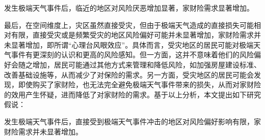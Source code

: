 \begin{hyp}
    \label{hyp:3}
    发生极端天气事件后，临近的地区对风险厌恶增加显著，家财险需求显著增加。
\end{hyp}
最后，在空间维度上，灾区虽然直接受灾，但由于极端天气造成的直接损失可能相对有限，直接受灾或是频繁受灾的地区风险偏好可能并未显著增加\citep{shao2024typhoons}，家财险需求并未显著增加，即所谓“心理台风眼效应”\citep{谢晓非2012心理台风眼效应研究综述}。具体而言，受灾地区的居民可能对极端天气事件有更深刻的认识和更高的风险感知。但一方面，这并不意味着他们的风险偏好会随之增加，居民可能通过其他方式来管理和降低风险，如加强房屋建设标准、改善基础设施等，从而减少了对保险的需求\citep{ZGRK202210006,JRYJ201403015}。另一方面，受灾地区的居民可能会发现，即使购买了家财险，也无法完全避免极端天气事件带来的损失，从而对家财险的效用产生怀疑，进而降低了对家财险的需求\citep{MumoWatt2017}。基于以上分析，本文提出如下研究假说：

\begin{hyp}
    \label{hyp:2}
    发生极端天气事件后，直接受到极端天气事件冲击的地区对风险偏好影响有限，家财险需求并未显著增加。
\end{hyp}
